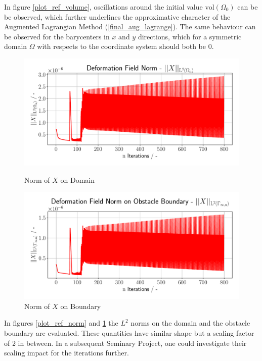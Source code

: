 In figure \ref{plot_ref_volume}, oscillations around the initial value $\mathrm{vol}(\Omega_0)$ can be
be observed, which further underlines the approximative character of the Augmented Lagrangian Method
(\ref{final_aug_lagrange}). The same behaviour can be observed for the barycenters in $x$ and $y$
directions, which for a symmetric domain $\Omega$ with respects to the coordinate system should
both be 0.
\begin{figure}[h]
    \begin{minipage}{.5\textwidth}
        \centering
        \includegraphics[width=1\textwidth]{figures/gfxnorm_plot.pdf}
        \caption{Norm of $X$ on Domain}
        \label{plot_ref_norm}
    \end{minipage}
    \begin{minipage}{.5\textwidth}
        \centering
        \includegraphics[width=1\textwidth]{figures/gfx_bndnorm_plot.pdf}
        \caption{Norm of $X$ on Boundary}
        \label{plot_ref_bndnorm}
    \end{minipage}
\end{figure}

In figures \ref{plot_ref_norm} and \ref{plot_ref_bndnorm} the $L^2$ norms on the domain
and the obstacle boundary are evaluated. These quantities have similar shape but a scaling factor of 2 
in between. In a subsequent Seminary Project, one could investigate their scaling impact for the iterations
further.

